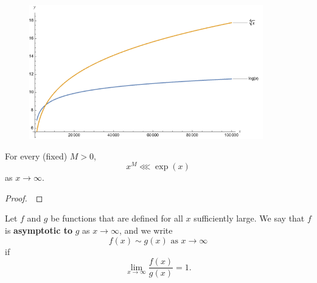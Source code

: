 \begin{figure}[H]
\includegraphics[width=4in]{img/log-growth2}
\end{figure}


\newpage

\begin{corollary}
For every (fixed) $M>0$,
\begin{equation*}
x^M\lll\exp(x)
\end{equation*}
as $x\to\infty$.
\end{corollary}

\ifdefined\SOLUTION
{}
\else
\begin{proof}\,

\vspace{1.5in}
\end{proof}
\fi

\begin{definition}
Let $f$ and $g$ be functions that are defined for all $x$ sufficiently large.
We say that $f$ is \textbf{asymptotic to} $g$ as $x\to \infty$, and we write
\begin{equation*}
f(x) \sim g(x) \text{ as } x\to \infty
\end{equation*}
if
\begin{equation*}
\lim_{x\to\infty}\frac{f(x)}{g(x)} = 1.
\end{equation*}
\end{definition}

